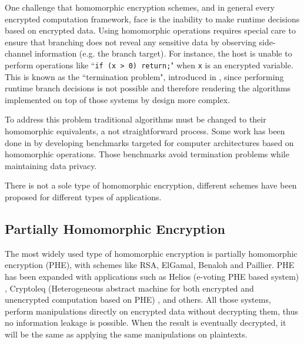 One challenge that homomorphic encryption schemes, and in general every encrypted computation framework, face is the inability to make runtime decisions based on encrypted data.
Using homomorphic operations requires special care to ensure that branching does not reveal any sensitive data by observing side-channel information (e.g. the branch target).
For instance, the host is unable to perform operations like ``\texttt{if (x > 0) return;}" when \texttt{x} is an encrypted variable.
This is known as the ``termination problem", introduced in \cite{brenner2011secret}, since performing runtime branch decisions is not possible and therefore rendering the algorithms implemented on top of those systems by design more complex.


To address this problem traditional algorithms must be changed to their homomorphic equivalents, a not straightforward process.
Some work has been done in \cite{mouris2018terminator} by developing benchmarks targeted for computer architectures based on homomorphic operations.
Those benchmarks avoid termination problems while maintaining data privacy.


There is not a sole type of homomorphic encryption, different schemes have been proposed for different types of applications.


\subsection{Partially Homomorphic Encryption}\label{ss:phe}
The most widely used type of homomorphic encryption is partially homomorphic encryption (PHE), with schemes like RSA, ElGamal, Benaloh and Paillier.
PHE has been expanded with applications such as Helios (e-voting PHE based system) \cite{adida2008helios}, Cryptoleq (Heterogeneous abstract machine for both encrypted and unencrypted computation based on PHE) \cite{mazonka2016cryptoleq}, and others.
All those systems, perform manipulations directly on encrypted data without decrypting them, thus no information leakage is possible.
When the result is eventually decrypted, it will be the same as applying the same manipulations on plaintexts.

